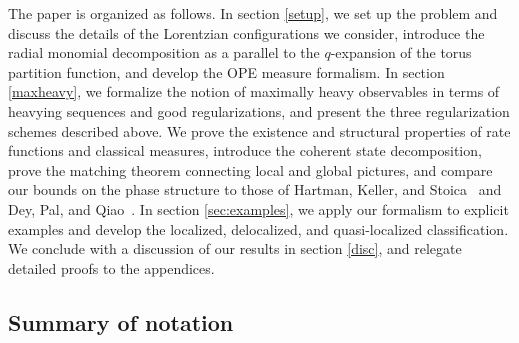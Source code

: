 \documentclass[a4paper,11pt]{article}
\theoremstyle{plain}
\theoremstyle{definition}
\theoremstyle{remark}
\begin{document}
The paper is organized as follows. In section \ref{setup}, we set up the problem and discuss the details of the Lorentzian configurations we consider, introduce the radial monomial decomposition as a parallel to the $q$-expansion of the torus partition function, and develop the OPE measure formalism. In section \ref{maxheavy}, we formalize the notion of maximally heavy observables in terms of heavying sequences and good regularizations, and present the three regularization schemes described above. We prove the existence and structural properties of rate functions and classical measures, introduce the coherent state decomposition, prove the matching theorem connecting local and global pictures, and compare our bounds on the phase structure to those of Hartman, Keller, and Stoica~\cite{Hartman:2014oaa} and Dey, Pal, and Qiao~\cite{Dey:2024nje}. In section \ref{sec:examples}, we apply our formalism to explicit examples and develop the localized, delocalized, and quasi-localized classification. We conclude with a discussion of our results in section \ref{disc}, and relegate detailed proofs to the appendices.


\subsection*{Summary of notation}
\label{sec:notation}
\end{document}
